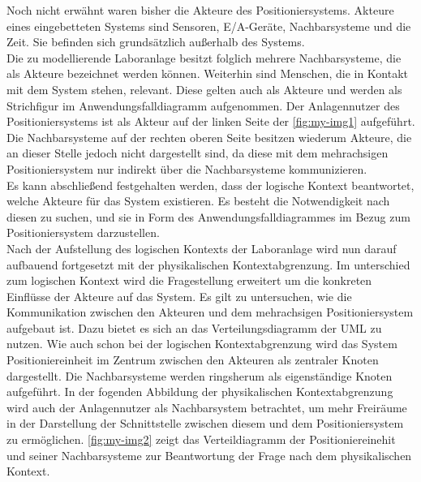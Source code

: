 \documentclass[../../../Bachelorarbeit.tex]{subfiles}
\begin{document}
Noch nicht erwähnt waren bisher die Akteure des Positioniersystems. Akteure eines eingebetteten Systems sind Sensoren, E/A-Geräte, Nachbarsysteme und die Zeit. Sie befinden sich grundsätzlich außerhalb des Systems. \\ %
Die zu modellierende Laboranlage besitzt folglich mehrere Nachbarsysteme, die als Akteure bezeichnet werden können. Weiterhin sind Menschen, die in Kontakt mit dem System stehen, relevant. Diese gelten auch als Akteure und werden als Strichfigur im Anwendungsfalldiagramm aufgenommen. Der Anlagennutzer des Positioniersystems ist als Akteur auf der linken Seite der \autoref{fig:my-img1} aufgeführt. Die Nachbarsysteme auf der rechten oberen Seite besitzen wiederum Akteure, die an dieser Stelle jedoch nicht dargestellt sind, da diese mit dem mehrachsigen Positioniersystem nur indirekt über die Nachbarsysteme kommunizieren.\\
Es kann abschließend festgehalten werden, dass der logische Kontext beantwortet, welche Akteure für das System existieren. Es besteht die Notwendigkeit nach diesen zu suchen, und sie in Form des Anwendungsfalldiagrammes im Bezug zum Positioniersystem darzustellen.\\
Nach der Aufstellung des logischen Kontexts der Laboranlage wird nun darauf aufbauend fortgesetzt mit der physikalischen Kontextabgrenzung. Im unterschied zum logischen Kontext wird die Fragestellung erweitert um die konkreten Einflüsse der Akteure auf das System. Es gilt zu untersuchen, wie die Kommunikation zwischen den Akteuren und dem mehrachsigen Positioniersystem aufgebaut ist. Dazu bietet es sich an das Verteilungsdiagramm der UML zu nutzen. Wie auch schon bei der logischen Kontextabgrenzung wird das System Positioniereinheit im Zentrum zwischen den Akteuren als zentraler Knoten dargestellt. Die Nachbarsysteme werden ringsherum als eigenständige Knoten aufgeführt. In der fogenden Abbildung der physikalischen Kontextabgrenzung wird auch der Anlagennutzer als Nachbarsystem betrachtet, um mehr Freiräume in der Darstellung der Schnittstelle zwischen diesem und dem Positioniersystem zu ermöglichen. \autoref{fig:my-img2} zeigt das Verteildiagramm der Positioniereinehit und seiner Nachbarsysteme zur Beantwortung der Frage nach dem physikalischen Kontext.\\
\end{document}
